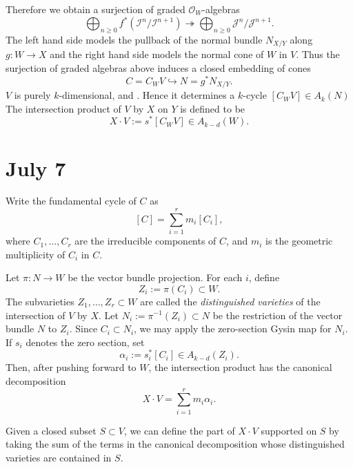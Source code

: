 \documentclass[12pt]{article}
\begin{document}
Therefore we obtain a surjection of graded
\(\mathcal O_W\)-algebras
\[
    \bigoplus_{n\geq 0}
    f^*\left(\mathcal I^n/\mathcal I^{n+1}\right)
    \twoheadrightarrow
    \bigoplus_{n\geq 0}
    \mathcal J^n/\mathcal J^{n+1}.
\]
The left hand side models the pullback of the normal bundle \(N_{X/Y}\) along \(g:W\to X\) and the right hand side models the normal cone of \(W\) in \(V\).
Thus the surjection of graded algebras above induces a closed embedding of
cones
\[
    C = C_WV\hookrightarrow N=g^*N_{X/Y}.
\]
\(V\) is purely \(k\)-dimensional, and . Hence it determines a \(k\)-cycle $[C_WV]\in A_k(N)$
The intersection product of \(V\) by \(X\) on \(Y\) is defined to be
\[
    X\cdot V
    :=
    s^*[C_WV]
    \in
    A_{k-d}(W).
\]
\section{July 7}
\begin{definition}
    Write the fundamental cycle of \(C\) as
    \[
        [C]=\sum_{i=1}^r m_i[C_i],
    \]
    where \(C_1,\dots,C_r\) are the irreducible components of \(C\), and
    \(m_i\) is the geometric multiplicity of \(C_i\) in \(C\).

    Let $\pi:N\to W$ be the vector bundle projection. For each \(i\), define
    \[
        Z_i:=\pi(C_i)\subset W.
    \]
    The subvarieties \(Z_1,\dots,Z_r\subset W\) are called the \emph{distinguished varieties} of the intersection of
    \(V\) by \(X\). Let $N_i:=\pi^{-1}(Z_i)\subset N$ be the restriction of the vector bundle \(N\) to $Z_i$. Since \(C_i\subset N_i\), we may apply the zero-section Gysin map for
    \(N_i\). If $s_i$ denotes the zero section, set
    \[
        \alpha_i:=s_i^*[C_i]\in A_{k-d}(Z_i).
    \]
    Then, after pushing forward to \(W\), the intersection product has the
    canonical decomposition
    \[
        X\cdot V
        =
        \sum_{i=1}^r m_i\alpha_i.
    \]
\end{definition}
Given a closed subset $S \subset V$, we can define the part of $X\cdot V$ supported on $S$ by taking the sum of the terms in the canonical decomposition whose distinguished varieties are contained in $S$. 
\end{document}
